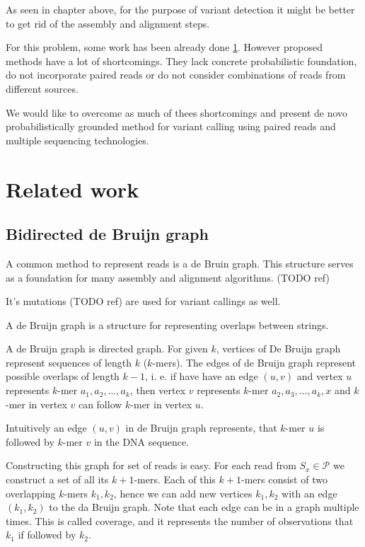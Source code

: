 As seen in chapter above, for the purpose of variant detection it might be better to get rid of the assembly and alignment steps. 

For this problem, some work has been already done \ref{sec:related}.
However proposed methods have a lot of shortcomings.
They lack concrete probabilistic foundation, do not incorporate paired reads or do not consider combinations of reads from different sources.

We would like to overcome as much of thees shortcomings and present de novo probabilistically 
grounded method for variant calling using paired reads and multiple sequencing technologies. 

\section{Related work} \label{sec:related}

\subsection{Bidirected de Bruijn graph}
A common method to represent reads is a de Bruin graph. 
This structure serves as a foundation for many assembly and alignment algorithms. (TODO ref)

It's mutations (TODO ref) are used for variant callings as well.

A de Bruijn graph \cite{de1946combinatorial} is a structure for representing overlaps between strings.

\begin{definicia}
A de Bruijn graph is directed graph. 
For given $k$, vertices of De Bruijn graph represent sequences of length $k$ ($k$-mers). 
The edges of de Bruijn graph represent possible overlaps of length $k-1$, i. e. if have have an edge $(u, v)$ and vertex $u$ represents $k$-mer $a_1 , a_2 , \ldots , a_k$, 
then vertex $v$ represents $k$-mer $a_2 , a_3 , \ldots , a_k , x$ and $k$-mer in vertex $v$ can follow $k$-mer in vertex $u$.
\end{definicia}

Intuitively an edge $(u, v)$ in de Bruijn graph represents, that $k$-mer $u$ is followed by $k$-mer $v$ in the DNA sequence.

Constructing this graph for set of reads is easy.
For each read from $ S_x \in \mathcal{P}$ we construct a set of all its $k+1$-mers. 
Each of this $k+1$-mers consist of two overlapping $k$-mers $k_1, k_2$, 
hence we can add new vertices $k_1, k_2$ with an edge $(k_1, k_2)$ to the da Bruijn graph.
Note that each edge can be in a graph multiple times. 
This is called coverage, and it represents the number of observations that $k_1$ if followed by $k_2$. 

